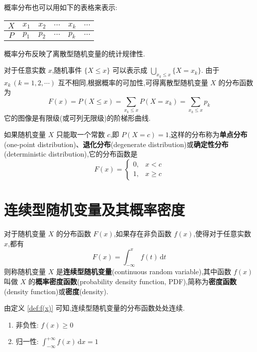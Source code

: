 概率分布也可以用如下的表格来表示:
\begin{table*}[htbp]
    \centering

    \begin{tabular}{c | c c c c c}
        \hline
        $X$ & $x_1$ & $x_2$ & $\cdots$ & $x_k$ & $\cdots$ \\
        \hline
        $P$ & $p_1$ & $p_2$ & $\cdots$ & $p_k$ & $\cdots$ \\
        \hline
    \end{tabular}
\end{table*}

概率分布反映了离散型随机变量的统计规律性.

对于任意实数 $x$,随机事件 $\{X \leqslant x\}$ 可以表示成 $\displaystyle\bigcup_{x_k \leqslant x} \{X=x_k\}$. 由于 $x_k\, (k=1,2,\cdots)$ 互不相同,根据概率的可加性,可得离散型随机变量 $X$ 的分布函数为
$$
F(x) = P(X \leqslant x) = \sum_{x_k \leqslant x} P(X=x_k) = \sum_{x_k \leqslant x} p_k
$$
它的图像是有限级(或可列无限级)的阶梯形曲线.

如果随机变量 $X$ 只能取一个常数 $c$,即 $P(X=c) = 1$,这样的分布称为\textbf{单点分布}(one-point distribution)、\textbf{退化分布}(degenerate distribution)或\textbf{确定性分布}(deterministic distribution),它的分布函数是
$$
F(x) = \begin{cases}
    0, & x < c \\
    1, & x \geqslant c
\end{cases}
$$

\section{连续型随机变量及其概率密度}

\begin{definition}[][][def:f(x)]
    \indent 对于随机变量 $X$ 的分布函数 $F(x)$,如果存在非负函数 $f(x)$,使得对于任意实数 $x$,都有
    $$
    F(x) = \int_{-\infty}^x f(t)\,\text{d}t
    $$
    则称随机变量 $X$ 是\textbf{连续型随机变量}(continuous random variable),其中函数 $f(x)$ 叫做 $X$ 的\textbf{概率密度函数}(probability density function, PDF),简称为\textbf{密度函数}(density function)或\textbf{密度}(density).
\end{definition}

由定义 \ref{def:f(x)} 可知,连续型随机变量的分布函数处处连续.

\begin{property}[][概率密度函数的基本性质]
    \begin{enumerate}[itemsep=0.2em]
        \item 非负性: $f(x) \geqslant 0$
        \item 归一性: $\displaystyle\int_{-\infty}^{+\infty} f(x)\,\text{d}x = 1$
    \end{enumerate}
\end{property}

